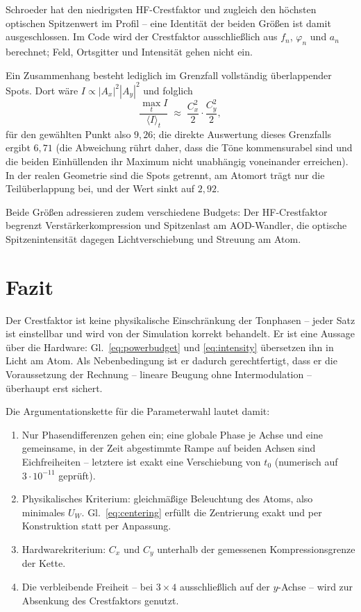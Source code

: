 \documentclass[11pt,a4paper]{article}
\newcommand{\crest}{\ensuremath{C}}
\newcommand{\Uw}{\ensuremath{U_W}}
\begin{document}
Schroeder hat den niedrigsten HF-Crestfaktor und zugleich den höchsten
optischen Spitzenwert im Profil -- eine Identität der beiden Größen ist damit
ausgeschlossen. Im Code wird der Crestfaktor ausschließlich aus $f_n$,
$\varphi_n$ und $a_n$ berechnet; Feld, Ortsgitter und Intensität gehen nicht
ein.

Ein Zusammenhang besteht lediglich im Grenzfall vollständig überlappender
Spots. Dort wäre $I \propto |A_x|^2|A_y|^2$ und folglich
\begin{equation}
  \frac{\max_t I}{\langle I\rangle_t}
  \;\approx\; \frac{\crest_x^{2}}{2}\cdot\frac{\crest_y^{2}}{2},
\end{equation}
für den gewählten Punkt also $9{,}26$; die direkte Auswertung dieses
Grenzfalls ergibt $6{,}71$ (die Abweichung rührt daher, dass die Töne
kommensurabel sind und die beiden Einhüllenden ihr Maximum nicht unabhängig
voneinander erreichen). In der realen Geometrie sind die Spots getrennt, am
Atomort trägt nur die Teilüberlappung bei, und der Wert sinkt auf $2{,}92$.

Beide Größen adressieren zudem verschiedene Budgets: Der HF-Crestfaktor
begrenzt Verstärkerkompression und Spitzenlast am AOD-Wandler, die optische
Spitzenintensität dagegen Lichtverschiebung und Streuung am Atom.

\section{Fazit}

Der Crestfaktor ist keine physikalische Einschränkung der Tonphasen -- jeder
Satz ist einstellbar und wird von der Simulation korrekt behandelt. Er ist
eine Aussage über die Hardware: Gl.~\eqref{eq:powerbudget} und
\eqref{eq:intensity} übersetzen ihn in Licht am Atom. Als Nebenbedingung ist
er dadurch gerechtfertigt, dass er die Voraussetzung der Rechnung -- lineare
Beugung ohne Intermodulation -- überhaupt erst sichert.

Die Argumentationskette für die Parameterwahl lautet damit:
\begin{enumerate}\itemsep0.2em
  \item Nur Phasendifferenzen gehen ein; eine globale Phase je Achse und eine
        gemeinsame, in der Zeit abgestimmte Rampe auf beiden Achsen sind
        Eichfreiheiten -- letztere ist exakt eine Verschiebung von $t_0$
        (numerisch auf $3\cdot10^{-11}$ geprüft).
  \item Physikalisches Kriterium: gleichmäßige Beleuchtung des Atoms, also
        minimales $\Uw$. Gl.~\eqref{eq:centering} erfüllt die Zentrierung
        exakt und per Konstruktion statt per Anpassung.
  \item Hardwarekriterium: $\crest_x$ und $\crest_y$ unterhalb der
        gemessenen Kompressionsgrenze der Kette.
  \item Die verbleibende Freiheit -- bei $3\times4$ ausschließlich auf der
        $y$-Achse -- wird zur Absenkung des Crestfaktors genutzt.
\end{enumerate}
\end{document}
